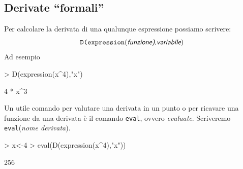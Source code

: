 \documentclass[onecolumn,11pt]{book}
\newcommand{\varia}[1]{\textsl{\textsf{#1}}}
\begin{document}
\subsection{Derivate ``formali''}
Per calcolare la derivata di una qualunque espressione possiamo scrivere:
\begin{equation*}\texttt{D(expression}(\varia{funzione),variabile})
\end{equation*}
Ad esempio
\begin{Schunk}
\begin{Sinput}
> D(expression(x^4),"x")
\end{Sinput}
\begin{Soutput}
4 * x^3
\end{Soutput}
\end{Schunk}
Un utile comando per valutare una derivata in un punto o per  ricavare una funzione da una derivata \`e il comando \texttt{eval}, ovvero {\it evaluate}. Scriveremo \texttt{eval}(\varia{nome derivata}).

\begin{Schunk}
\begin{Sinput}
> x<-4
> eval(D(expression(x^4),"x"))
\end{Sinput}
\begin{Soutput}
[1] 256
\end{Soutput}
\end{Schunk}
\end{document}
